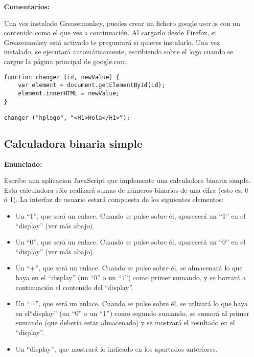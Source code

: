 \textbf{Comentarios:}

Una vez instalado Greasemonkey, puedes crear un fichero google.user.js con un contenido como el que ves a continuación. Al cargarlo desde Firefox, si Greasemonkey está activado te preguntará si quieres instalarlo. Una vez instalado, se ejecutará automáticamente, escribiendo sobre el logo cuando se cargue la página principal de google.com.

\begin{verbatim}
function changer (id, newValue) {
    var element = document.getElementById(id);
    element.innerHTML = newValue;
}

changer ("hplogo", "<H1>Hola</H1>");
\end{verbatim}

\subsection{Calculadora binaria simple}
\label{subsec:eje-js-calc-binaria-1}


\textbf{Enunciado:}

Escribe una aplicacion JavaScript que implemente una calculadora binaria simple. Esta calculadora sólo realizará sumas de números binarios de una cifra (esto es, 0 ó 1). La interfaz de usuario estará compuesta de los siguientes elementos:

\begin{itemize}
\item Un ``1'', que será un enlace. Cuando se pulse sobre él, aparecerá un ``1'' en el ``display'' (ver más abajo).
\item Un ``0'', que será un enlace. Cuando se pulse sobre él, aparecerá un ``0'' en el ``display'' (ver más abajo).
\item Un ``+'', que será un enlace. Cuando se pulse sobre él, se almacenará lo que haya en el ``display'' (un ``0'' o un ``1'') como primer sumando, y se borrará a continuación el contenido del ``display''.
\item Un ``='', que será un enlace. Cuando se pulse sobre él, se utlizará lo que haya en el``display'' (un ``0'' o un ``1'') como segundo sumando, se sumará al primer sumando (que debería estar almacenado) y se mostrará el resultado en el ``display''.
\item Un ``display'', que mostrará lo indicado en los apartados anteriores.
\end{itemize}

